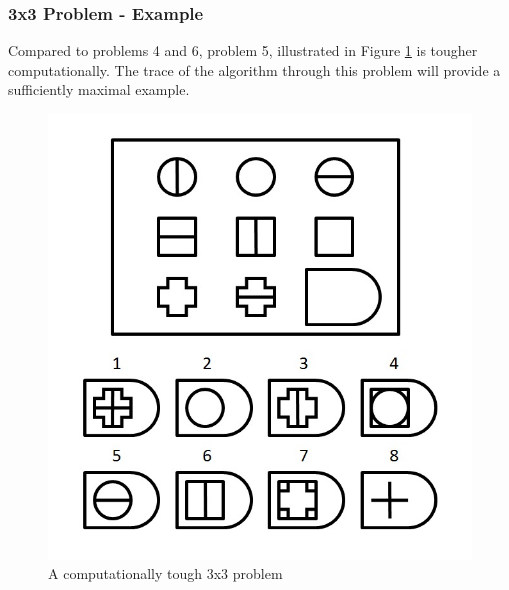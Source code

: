 \documentclass[10pt, letter]{article}
\begin{document}
\subsubsection*{3x3 Problem - Example}
Compared to problems 4 and 6, problem 5, illustrated in Figure \ref{fig11} is tougher computationally. The trace of the algorithm through this problem will provide a sufficiently maximal example.

\begin{figure}[h!]
  \centering
    \includegraphics[scale = 0.25]{Images/Fig11}
    \caption{A computationally tough 3x3 problem}
  \label{fig11}
\end{figure}
\end{document}
